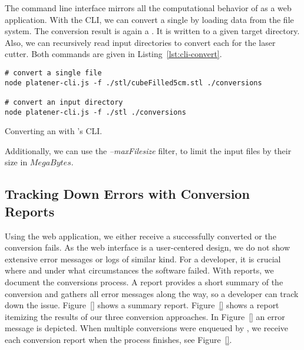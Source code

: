 \documentclass[../ClassicThesis.tex]{subfiles}
\begin{document}
The command line interface mirrors all the computational behavior of
{\platener} as a web application. With the CLI, we can convert a
single {\threedmodel} by loading data from the file system. The
conversion result is again a {\zipfile}. It is written to a given
target directory. Also, we can recursively read input directories to
convert each {\stlfile} for the laser cutter. Both commands are given
in Listing~\ref{lst:cli-convert}.


\begin{listing}[!h]
\begin{verbatim}
# convert a single file
node platener-cli.js -f ./stl/cubeFilled5cm.stl ./conversions

# convert an input directory
node platener-cli.js -f ./stl ./conversions
\end{verbatim}
\caption{Converting an {\stlfile} with {\platener}'s CLI.}
\label{lst:cli-convert}
\end{listing}

Additionally, we can use the \emph{--maxFilesize} filter, to limit the
input files by their size in \ensuremath{MegaBytes}.

\subsection{Tracking Down Errors with Conversion Reports}
\label{sec:walkthrough-cli-reports}

Using the web application, we either receive a successfully converted
{\svgfile} or the conversion fails. As the web interface is a
user-centered design, we do not show extensive error messages or logs
of similar kind. For a developer, it is crucial where and under what
circumstances the software failed. With reports, we document the
conversions process. A report provides a short summary of the
conversion and gathers all error messages along the way, so a
developer can track down the issue. Figure~\ref{} shows a summary
report. Figure~\ref{} shows a report itemizing the results of our
three conversion approaches. In Figure~\ref{} an error message is
depicted. When multiple conversions were enqueued by {\platener}, we
receive each conversion report when the process finishes, see
Figure~\ref{}.
\end{document}
